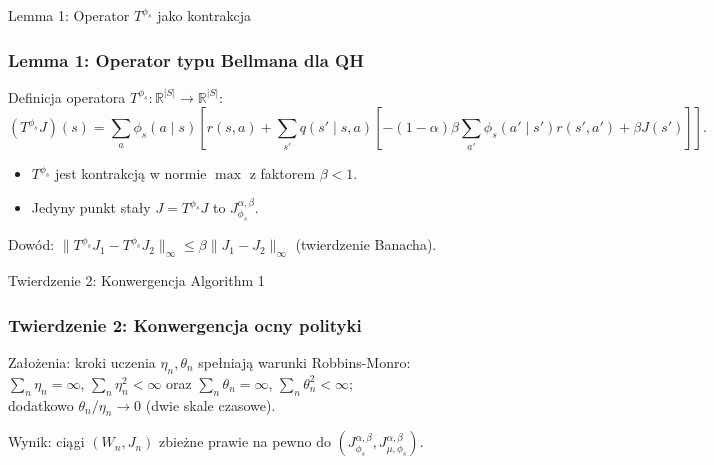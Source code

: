 \begin{frame}{Lemma 1: Operator $T^{\phi_s}$ jako kontrakcja}
\frametitle{Lemma 1: Operator typu Bellmana dla QH}
Definicja operatora $T^{\phi_s}: \mathbb{R}^{|S|} \to \mathbb{R}^{|S|}$:
\begin{equation}
(T^{\phi_s} J)(s) = \sum_a \phi_s(a\mid s) \left[ r(s, a) + \sum_{s'} q(s'\mid s, a) \left[ -(1 - \alpha)\beta \sum_{a'} \phi_s(a'\mid s') r(s', a') + \beta J(s') \right] \right].
\end{equation}
\begin{itemize}
\item $T^{\phi_s}$ jest kontrakcją w normie $\max$ z faktorem $\beta < 1$.
\item Jedyny punkt stały $J = T^{\phi_s} J$ to $J^{\alpha, \beta}_{\phi_s}$.
\end{itemize}
Dowód: $\|T^{\phi_s} J_1 - T^{\phi_s} J_2\|_\infty \leq \beta \|J_1 - J_2\|_\infty$ (twierdzenie Banacha).
\end{frame}

\begin{frame}{Twierdzenie 2: Konwergencja Algorithm 1}
\frametitle{Twierdzenie 2: Konwergencja ocny polityki}
Założenia: kroki uczenia $\eta_n, \theta_n$ spełniają warunki Robbins-Monro: \\ $\sum_n \eta_n = \infty$, $\sum_n \eta_n^2 < \infty$ oraz $\sum_n \theta_n = \infty$, $\sum_n \theta_n^2 < \infty$; \\ dodatkowo $\theta_n / \eta_n \to 0$ (dwie skale czasowe).

Wynik: ciągi $(W_n, J_n)$ zbieżne prawie na pewno do $(J^{\alpha, \beta}_{\phi_s}, J^{\alpha, \beta}_{\mu, \phi_s})$.

\end{frame}
